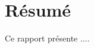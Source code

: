 \newpage
\thispagestyle{empty}
\section*{\centering \small Résumé}
\hspace*{0.75cm} Ce rapport présente ....